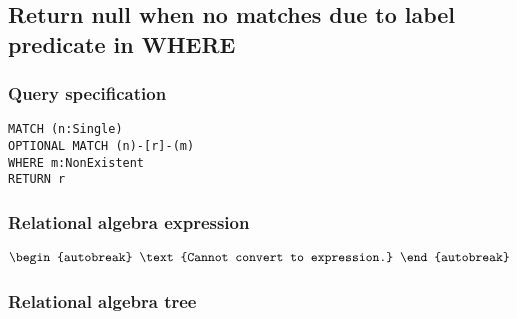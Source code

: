
\subsection{Return null when no matches due to label predicate in WHERE}

\subsubsection*{Query specification}

\begin{lstlisting}
MATCH (n:Single)
OPTIONAL MATCH (n)-[r]-(m)
WHERE m:NonExistent
RETURN r
\end{lstlisting}

\subsubsection*{Relational algebra expression}

\begin{align*}
\begin{autobreak}
\text{Cannot convert to expression.}
\end{autobreak}
\end{align*}

\subsubsection*{Relational algebra tree}

